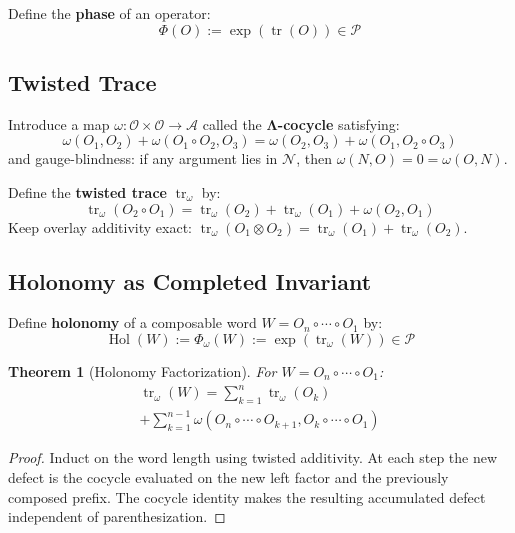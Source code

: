 \documentclass[12pt, oneside]{article}
\newtheorem{theorem}{Theorem}[section]
\DeclareMathOperator{\tr}{tr}
\DeclareMathOperator{\Hol}{Hol}
\newcommand{\N}{\mathcal{N}}
\newcommand{\A}{\mathcal{A}}
\newcommand{\Opr}{\mathcal{O}}
\begin{document}
Define the \textbf{phase} of an operator:
\begin{equation}
\Phi(O) := \exp(\tr(O)) \in \mathcal{P}
\end{equation}

\subsection{Twisted Trace}

Introduce a map $\omega: \Opr \times \Opr \rightarrow \A$ called the \textbf{Λ-cocycle} satisfying:
\begin{equation}
\omega(O_1, O_2) + \omega(O_1 \circ O_2, O_3) = \omega(O_2, O_3) + \omega(O_1, O_2 \circ O_3)
\end{equation}
and gauge-blindness: if any argument lies in $\N$, then $\omega(N, O) = 0 = \omega(O, N)$.

Define the \textbf{twisted trace} $\tr_\omega$ by:
\begin{equation}
\tr_\omega(O_2 \circ O_1) = \tr_\omega(O_2) + \tr_\omega(O_1) + \omega(O_2, O_1)
\end{equation}
Keep overlay additivity exact: $\tr_\omega(O_1 \otimes O_2) = \tr_\omega(O_1) + \tr_\omega(O_2)$.

\subsection{Holonomy as Completed Invariant}

Define \textbf{holonomy} of a composable word $W = O_n \circ \cdots \circ O_1$ by:
\begin{equation}
\Hol(W) := \Phi_\omega(W) := \exp(\tr_\omega(W)) \in \mathcal{P}
\end{equation}

\begin{theorem}[Holonomy Factorization]
For $W = O_n \circ \cdots \circ O_1$:
\begin{multline}
\tr_\omega(W) = \sum_{k=1}^n \tr_\omega(O_k) \\
+ \sum_{k=1}^{n-1} \omega(O_n \circ \cdots \circ O_{k+1}, O_k \circ \cdots \circ O_1)
\end{multline}
\end{theorem}
\begin{proof}
Induct on the word length using twisted additivity. At each step the new defect is the cocycle evaluated on the new left factor and the previously composed prefix. The cocycle identity makes the resulting accumulated defect independent of parenthesization.
\end{proof}
\end{document}

